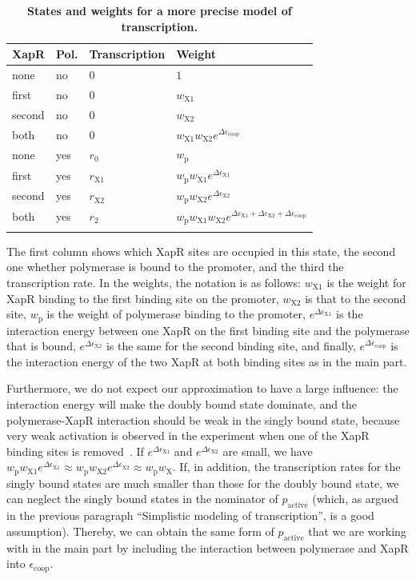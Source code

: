 \documentclass[10pt,letterpaper]{article}
\newlength\savedwidth
\newcommand\thickhline{\noalign{\global\savedwidth\arrayrulewidth\global\arrayrulewidth 2pt}%
	\hline
	\noalign{\global\arrayrulewidth\savedwidth}}
\newcommand{\n}[1]{\mathrm{#1}}
\begin{document}
\begin{table}
	\centering
	\caption{
		{\bf States and weights for a more precise model of transcription.}}
	\begin{tabular}{llll}
		\thickhline
		XapR & Pol. & Transcription & Weight \\
		\hline
		none & no & $0$ & $1$ \\
		first & no & $0$ & $w_{\n{X1}}$ \\
		second & no & $0$ & $w_{\n{X2}}$ \\
		both & no & $0$ & $w_{\n{X1}} w_{\n{X2}} e^{\Delta \epsilon_{\n{coop}}}$ \\
		none & yes & $r_0$ & $w_{\n{p}}$ \\
		first & yes & $r_{\n{X1}}$ & $w_{\n{p}} w_{\n{X1}} e^{\Delta \epsilon_{\n{X1}}}$ \\
		second & yes & $r_{\n{X2}}$ & $w_{\n{p}} w_{\n{X2}} e^{\Delta \epsilon_{\n{X2}}}$ \\
		both & yes & $r_2$ & $w_{\n{p}} w_{\n{X1}} w_{\n{X2}} e^{\Delta \epsilon_{\n{X1}} + \Delta \epsilon_{\n{X2}} + \Delta \epsilon_{\n{coop}}}$ \\
		\thickhline
	\end{tabular}
	\begin{flushleft} 
		The first column shows which XapR sites are occupied in this state,
		the second one whether polymerase is bound to the promoter, and the
		third the transcription rate. In the weights, the notation is as
		follows: $w_{\n{X1}}$ is the weight for XapR binding to the first
		binding site on the promoter, $w_{\n{X2}}$ is that to the second
		site, $w_{\n{p}}$ is the weight of polymerase binding to the
		promoter, $e^{\Delta \epsilon_{\n{X1}}}$ is the interaction energy
		between one XapR on the first binding site and the polymerase that
		is bound, $e^{\Delta \epsilon_{\n{X2}}}$ is the same for the second
		binding site, and finally, $e^{\Delta \epsilon_{\n{coop}}}$ is the
		interaction energy of the two XapR at both binding sites as in the
		main part.
	\end{flushleft}
	\label{tableSI1:statesPromoter}
\end{table}

Furthermore, we do not expect our approximation to have a large influence:
the interaction energy will make the doubly bound state dominate, and the
polymerase-XapR interaction should be weak in the singly bound state,
because very weak activation is observed in the experiment when one of the
XapR binding sites is removed~\cite{Chure2019}. If $e^{\Delta
\epsilon_{\n{X1}}}$ and $e^{\Delta \epsilon_{\n{X2}}}$ are small, we have
$w_{\n{p}} w_{\n{X1}} e^{\Delta \epsilon_{\n{X1}}} \approx w_{\n{p}}
w_{\n{X2}} e^{\Delta \epsilon_{\n{X2}}} \approx w_{\n{p}} w_{\n{X}}$. If, in
addition, the transcription rates for the singly bound states are much
smaller than those for the doubly bound state, we can neglect the singly
bound states in the nominator of $p_{\n{active}}$ (which, as argued in the
previous paragraph ``Simplistic modeling of transcription'', is a good
assumption). Thereby, we can obtain the same form of $p_{\n{active}}$ that
we are working with in the main part by including the interaction between
polymerase and XapR into $\epsilon_{\n{coop}}$.
\end{document}
